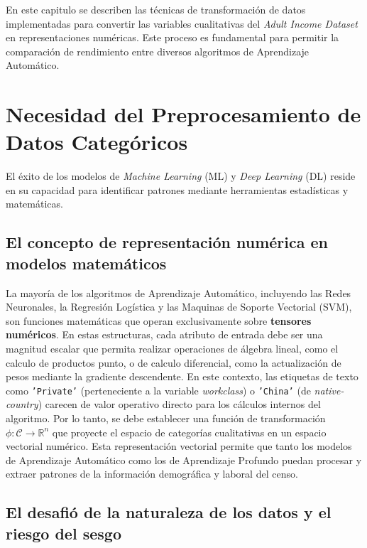 \documentclass[a4paper,10pt]{book}
\begin{document}
		En este capitulo se describen las técnicas de transformación de datos implementadas para convertir las variables cualitativas del \textit{Adult Income Dataset} en representaciones numéricas. Este proceso es fundamental para permitir la comparación de rendimiento entre diversos algoritmos de Aprendizaje Automático. 
		
		\section{Necesidad del Preprocesamiento de Datos Categóricos}
			
			El éxito de los modelos de \textit{Machine Learning} (ML) y \textit{Deep Learning} (DL) reside en su capacidad para identificar patrones mediante herramientas estadísticas y matemáticas.
			
			\subsection{El concepto de representación numérica en modelos matemáticos}
			
				La mayoría de los algoritmos de Aprendizaje Automático, incluyendo las Redes Neuronales, la Regresión Logística y las Maquinas de Soporte Vectorial (SVM), son funciones matemáticas que operan exclusivamente sobre \textbf{tensores numéricos}. En estas estructuras, cada atributo de entrada debe ser una magnitud escalar que permita realizar operaciones de álgebra lineal, como el calculo de productos punto, o de calculo diferencial, como la actualización de pesos mediante la gradiente descendente.
				En este contexto, las etiquetas de texto como \texttt{'Private'} (perteneciente a la variable \textit{workclass}) o \texttt{'China'} (de \textit{native-country}) carecen de valor operativo directo para los cálculos internos del algoritmo. Por lo tanto, se debe establecer una función de transformación $\phi: \mathcal{C} \rightarrow \mathbb{R}^n$ que proyecte el espacio de categorías cualitativas en un espacio vectorial numérico. Esta representación vectorial permite que tanto los modelos de Aprendizaje Automático como los de Aprendizaje Profundo puedan procesar y extraer patrones de la información demográfica y laboral del censo.

	\subsection{El desafió de la naturaleza de los datos y el riesgo del sesgo}
	
\end{document}
